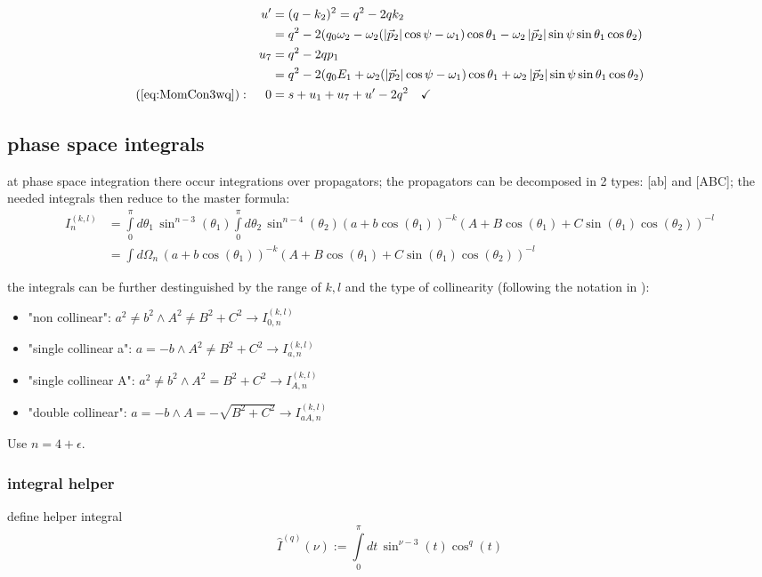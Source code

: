 \documentclass[
  english,		%
  a4paper,		%
  11pt,			%
  DIV=12,
  titlepage,
  toc=bibnumbered,
  parskip=full,  	%
  headings=normal,
  BCOR=12mm,
  numbers=noenddot
]{scrartcl}
\begin{document}
\begin{align}
&&u' &=(q-k_2)^2 = q^2-2qk_2\\
&& &= q^2-2(q_0\omega_2 -\omega_2(\left|\vec p_2\right|\cos\psi-\omega_1)\cos\theta_1-\omega_2\left|\vec p_2\right|\sin\psi\sin\theta_1\cos\theta_2)\\
&&u_7 &= q^2-2qp_1\\
&& &=q^2 - 2(q_0E_1 +\omega_2(\left|\vec p_2\right|\cos\psi-\omega_1)\cos\theta_1 + \omega_2\left|\vec p_2\right|\sin\psi\sin\theta_1\cos\theta_2)\\
(\ref{eq:MomCon3wq}): &&0 &=s+u_1+u_7+u'-2q^2\quad\checkmark
\end{align}

\subsection{phase space integrals}
at phase space integration there occur integrations over propagators\cite{Bojak:2000eu,PhysRevD.40.54,van_neerven_dimensional_1986}; the propagators can be decomposed in 2 types: [ab] and [ABC]; the needed integrals then reduce to the master formula:
\begin{align}
I_n^{(k,l)} &=\int\limits_0^\pi\!d\theta_1\,\sin^{n-3}(\theta_1)\int\limits_0^\pi\!d\theta_2\,\sin^{n-4}(\theta_2)(a+b\cos(\theta_1))^{-k}(A+B\cos(\theta_1)+C\sin(\theta_1)\cos(\theta_2))^{-l}\\
&=\int\!d\Omega_n\,(a+b\cos(\theta_1))^{-k}(A+B\cos(\theta_1)+C\sin(\theta_1)\cos(\theta_2))^{-l}
\end{align}

the integrals can be further destinguished by the range of $k,l$ and the type of collinearity (following the notation in \cite{Bojak:2000eu}):
\begin{itemize}
\item "non collinear": $a^2\neq b^2 \land A^2 \neq B^2 + C^2 \rightarrow I_{0,n}^{(k,l)}$
\item "single collinear a": $a=-b \land A^2 \neq B^2 + C^2 \rightarrow I_{a,n}^{(k,l)}$
\item "single collinear A": $a^2\neq b^2 \land A^2 = B^2 + C^2 \rightarrow I_{A,n}^{(k,l)}$
\item "double collinear": $a=-b \land A = -\sqrt{B^2 + C^2} \rightarrow I_{aA,n}^{(k,l)}$
\end{itemize}

Use $n=4+\epsilon$.

\subsubsection{integral helper}
define helper integral
\begin{equation}
\hat I^{(q)}(\nu) := \int\limits_0^\pi\!dt\,\sin^{\nu-3}(t)\cos^{q}(t)
\end{equation}
\end{document}

